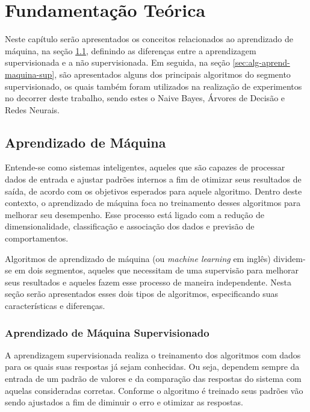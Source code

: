 \documentclass[oneside,openright,12pt]{ufsm_2015} %
\begin{document}
\chapter{Fundamentação Teórica}
\label{sec:fund-teorica}

    \par Neste capítulo serão apresentados os conceitos relacionados ao aprendizado de máquina, na seção \ref{sec:aprend-maquina}, definindo as diferenças entre a aprendizagem supervisionada e a não supervisionada. Em seguida, na seção \ref{sec:alg-aprend-maquina-sup}, são apresentados alguns dos principais algoritmos do segmento supervisionado, os quais também foram utilizados na realização de experimentos no decorrer deste trabalho, sendo estes o Naive Bayes, Árvores de Decisão e Redes Neurais.


\section{Aprendizado de Máquina}
\label{sec:aprend-maquina}

    \par Entende-se como sistemas inteligentes, aqueles que são capazes de processar dados de entrada e ajustar padrões internos a fim de otimizar seus resultados de saída, de acordo com os objetivos esperados para aquele algoritmo. Dentro deste contexto, o aprendizado de máquina foca no treinamento desses algoritmos para melhorar seu desempenho. Esse processo está ligado com a redução de dimensionalidade, classificação e associação dos dados e previsão de comportamentos.

    \par Algoritmos de aprendizado de máquina (ou \textit{machine learning} em inglês) dividem-se em dois segmentos, aqueles que necessitam de uma supervisão para melhorar seus resultados e aqueles fazem esse processo de maneira independente. Nesta seção serão apresentados esses dois tipos de algoritmos, especificando suas características e diferenças.


\subsection{Aprendizado de Máquina Supervisionado}
\label{sec:aprend-maquina-sup}

    \par A aprendizagem supervisionada realiza o treinamento dos algoritmos com dados para os quais suas respostas já sejam conhecidas. Ou seja, dependem sempre da entrada de um padrão de valores e da comparação das respostas do sistema com aquelas consideradas corretas. Conforme o algoritmo é treinado seus padrões vão sendo ajustados a fim de diminuir o erro e otimizar as respostas. 
\end{document}
